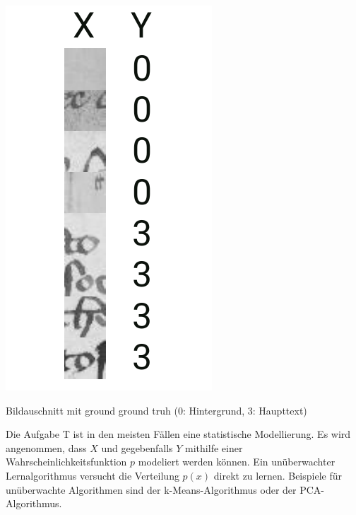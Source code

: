 \begin{marginfigure}
    \includegraphics[width=\textwidth]{figures/tasks/chen_examples.pdf}
    \caption{Bildauschnitt mit ground ground truh (0: Hintergrund, 3: Haupttext)}
    \label{fig:chen:cnn_task}
\end{marginfigure}

Die Aufgabe T ist in den meisten Fällen eine statistische Modellierung.
Es wird angenommen, dass \(X\) und gegebenfalls \(Y\) mithilfe einer Wahrscheinlichkeitsfunktion \(p\)
modeliert werden können. 
Ein unüberwachter Lernalgorithmus versucht die Verteilung \(p(x)\) direkt zu lernen.
Beispiele für unüberwachte Algorithmen sind der k-Means-Algorithmus oder der PCA-Algorithmus.

